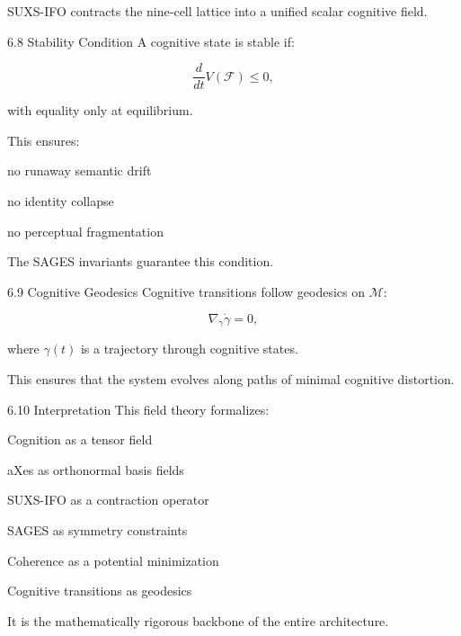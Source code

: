 SUXS-IFO contracts the nine‑cell lattice into a unified scalar cognitive field.

6.8 Stability Condition A cognitive state is stable if:

\[
\frac{d}{dt} V(\mathcal{F}) \le 0,
\]

with equality only at equilibrium.

This ensures:

no runaway semantic drift

no identity collapse

no perceptual fragmentation

The SAGES invariants guarantee this condition.

6.9 Cognitive Geodesics Cognitive transitions follow geodesics on \(\mathcal{M}\):

\[
\nabla_{\dot{\gamma}} \dot{\gamma} = 0,
\]

where \(\gamma(t)\) is a trajectory through cognitive states.

This ensures that the system evolves along paths of minimal cognitive distortion.

6.10 Interpretation This field theory formalizes:

Cognition as a tensor field

aXes as orthonormal basis fields

SUXS-IFO as a contraction operator

SAGES as symmetry constraints

Coherence as a potential minimization

Cognitive transitions as geodesics

It is the mathematically rigorous backbone of the entire architecture.

